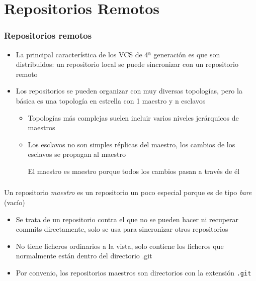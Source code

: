 \documentclass[ucs]{beamer}
\begin{document}
\section{Repositorios Remotos}
\begin{frame}[fragile]
\frametitle{Repositorios remotos}
\begin{itemize}
\item
La principal característica de los VCS de 4ª generación
es que son distribuidos: un repositorio local se puede
sincronizar con un repositorio remoto
\item
Los repositorios se pueden organizar con muy diversas
topologías, pero la básica es una topología en estrella
con 1 maestro y n esclavos

\begin{itemize}
\item
Topologías más complejas suelen incluir varios niveles
jerárquicos de maestros
\item
Los esclavos no son simples réplicas del maestro, los cambios de
los esclavos se propagan al maestro

El maestro es maestro porque todos los cambios pasan a través
de él
\end{itemize}

\end{itemize}

\end{frame}


\begin{frame}[fragile]
\frametitle{}
Un repositorio \emph{maestro} es un repositorio un poco especial porque
es de tipo \emph{bare} (vacío)

\begin{itemize}
\item
Se trata de un repositorio contra el que 
no se pueden hacer ni recuperar commits
directamente, solo se usa para sincronizar otros repositorios

\item
No tiene ficheros ordinarios a la vista, 
solo contiene los 
ficheros que normalmente
están dentro del directorio .git
\item 
Por convenio, los repositorios maestros son directorios
con la extensión \verb|.git|

\end{itemize}

\end{frame}
\end{document}
